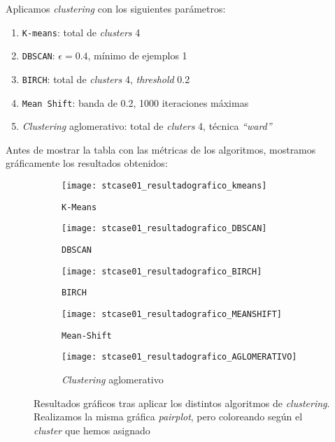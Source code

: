 \documentclass[11pt]{article}
\newcommand{\entrecomillado}[1]{\emph{``#1''}}
\begin{document}
Aplicamos \emph{clustering} con los siguientes parámetros:

\begin{enumerate}
    \item \lstinline{K-means}: total de \emph{clusters} 4
    \item \lstinline{DBSCAN}: $\epsilon = 0.4$, mínimo de ejemplos 1
    \item \lstinline{BIRCH}: total de \emph{clusters} 4, \emph{threshold} 0.2
    \item \lstinline{Mean Shift}: banda de 0.2, 1000 iteraciones máximas
    \item \emph{Clustering} aglomerativo: total de \emph{cluters} 4, técnica \entrecomillado{ward}
\end{enumerate}

Antes de mostrar la tabla con las métricas de los algoritmos, mostramos gráficamente los resultados obtenidos:

\begin{figure}[H]
    \centering

    \begin{subfigure}[b]{0.45 \textwidth}
        \texttt{[image: stcase01\_resultadografico\_kmeans]}
        \caption{\lstinline{K-Means}}
    \end{subfigure}
    \begin{subfigure}[b]{0.45 \textwidth}
        \texttt{[image: stcase01\_resultadografico\_DBSCAN]}
        \caption{\lstinline{DBSCAN}}
    \end{subfigure}

    \begin{subfigure}[b]{0.45 \textwidth}
        \texttt{[image: stcase01\_resultadografico\_BIRCH]}
        \caption{\lstinline{BIRCH}}
    \end{subfigure}
    \begin{subfigure}[b]{0.45 \textwidth}
        \texttt{[image: stcase01\_resultadografico\_MEANSHIFT]}
        \caption{\lstinline{Mean-Shift}}
    \end{subfigure}

    \begin{subfigure}[b]{0.45 \textwidth}
        \texttt{[image: stcase01\_resultadografico\_AGLOMERATIVO]}
        \caption{\emph{Clustering} aglomerativo}
    \end{subfigure}


    \caption{Resultados gráficos tras aplicar los distintos algoritmos de \emph{clustering}. Realizamos la misma gráfica \emph{pairplot}, pero coloreando según el \emph{cluster} que hemos asignado}
    \label{stcase01_resultados_graficos:figure}

\end{figure}
\end{document}
